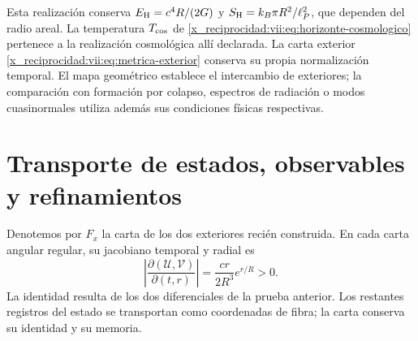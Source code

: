 Esta realización conserva
\(E_{\rm H}=c^4R/(2G)\) y
\(S_{\rm H}=k_B\pi R^2/\ell_P^2\), que dependen del radio areal.
La temperatura \(T_{\rm cos}\) de
\eqref{x_reciprocidad:vii:eq:horizonte-cosmologico} pertenece a la realización
cosmológica allí declarada. La carta exterior
\eqref{x_reciprocidad:vii:eq:metrica-exterior} conserva su propia normalización temporal.
El mapa geométrico establece el intercambio de exteriores; la comparación
con formación por colapso, espectros de radiación o modos cuasinormales
utiliza además sus condiciones físicas respectivas.

\section{Transporte de estados, observables y refinamientos}
\label{x_reciprocidad:vii:subsec:transporte-informacion-horizonte}

Denotemos por \(F_x\) la carta de los dos exteriores recién construida.
En cada carta angular regular, su jacobiano temporal y radial es
\begin{equation}
 \left|\frac{\partial(\mathcal U,\mathcal V)}{\partial(t,r)}\right|
 =\frac{cr}{2R^3}e^{r/R}>0.
 \label{x_reciprocidad:vii:eq:jacobiano-kruskal}
\end{equation}
La identidad resulta de los dos diferenciales de la prueba anterior.
Los restantes registros del estado se transportan como coordenadas de
fibra; la carta conserva su identidad y su memoria.

